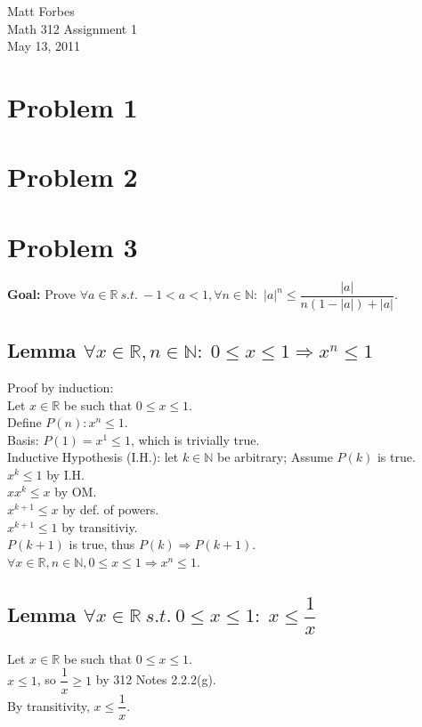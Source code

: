 \documentclass[fleqn,a4paper,12pt]{article}
\begin{document}
Matt Forbes\\
Math 312 Assignment 1\\
May 13, 2011\\

\section{Problem 1}


\section{Problem 2}
\section{Problem 3}

{\bf Goal:} Prove $\forall a \in \mathbb{R} \ s.t. \  -1 < a < 1, \forall n \in \mathbb{N}:$ 
$|a|^n \le \dfrac{|a|}{n(1-|a|)+|a|}.$

\subsection{Lemma $\forall x \in \mathbb{R}, n \in \mathbb{N}: \; 0 \le x \le 1 \Rightarrow x^n \le 1$}
Proof by induction:\\

Let $x \in \mathbb{R}$ be such that $0 \le x \le 1$. \\
Define $P(n) : x^n \le 1$. \\


Basis: $P(1) = x^1 \le 1$, which is trivially true.\\


Inductive Hypothesis (I.H.): let $k \in \mathbb{N}$ be arbitrary; Assume $P(k)$ is true.\\
$x^k \le 1$ by I.H. \\
$xx^k \le x$ by OM. \\
$x^{k+1} \le x$ by def. of powers. \\
$x^{k+1} \le 1$ by transitiviy. \\
$P(k+1)$ is true, thus $P(k) \Rightarrow P(k+1)$.\\

$\forall x \in \mathbb{R}, n \in \mathbb{N}, 0 \le x \le 1 \Rightarrow x^n \le 1$.

\subsection{Lemma $ \forall x \in \mathbb{R} \ s.t. \  0 \le x \le 1: \; x \le \dfrac{1}{x}$ }
Let $x \in \mathbb{R}$ be such that $0 \le x \le 1$. \\
$x \le 1$, so $\dfrac{1}{x} \ge 1$ by 312 Notes 2.2.2(g). \\
By transitivity, $x \le \dfrac{1}{x}$.
\end{document}
